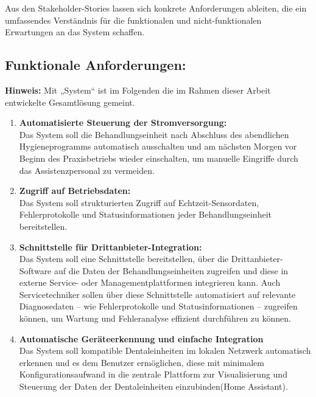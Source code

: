 Aus den Stakeholder-Stories lassen sich konkrete Anforderungen ableiten, die ein umfassendes Verständnis für die funktionalen und nicht-funktionalen Erwartungen an das System schaffen.

\subsection{Funktionale Anforderungen:}
\textbf{Hinweis:} Mit „System“ ist im Folgenden die im Rahmen dieser Arbeit entwickelte Gesamtlösung gemeint.

\begin{enumerate}
    \item \textbf{Automatisierte Steuerung der Stromversorgung:} \\
    Das System soll die Behandlungseinheit nach Abschluss des abendlichen Hygieneprogramms automatisch ausschalten und am nächsten Morgen vor Beginn des Praxisbetriebs wieder einschalten, um manuelle Eingriffe durch das Assistenzpersonal zu vermeiden.\\
    
    \item \textbf{Zugriff auf Betriebsdaten:} \\
    Das System soll strukturierten Zugriff auf Echtzeit-Sensordaten, Fehlerprotokolle und Statusinformationen jeder Behandlungseinheit bereitstellen.\\

    \item \textbf{Schnittstelle für Drittanbieter-Integration:} \\
    Das System soll eine Schnittstelle bereitstellen, über die Drittanbieter-Software auf die Daten der Behandlungseinheiten zugreifen und diese in externe Service- oder Managementplattformen integrieren kann. Auch Servicetechniker sollen über diese Schnittstelle automatisiert auf relevante Diagnosedaten – wie Fehlerprotokolle und Statusinformationen – zugreifen können, um Wartung und Fehleranalyse effizient durchführen zu können.\\

    \item \textbf{Automatische Geräteerkennung und einfache Integration} \\
    Das System soll kompatible Dentaleinheiten im lokalen Netzwerk automatisch erkennen und es dem Benutzer ermöglichen, diese mit minimalem Konfigurationsaufwand in die zentrale Plattform zur Visualisierung und Steuerung der Daten der Dentaleinheiten einzubinden(Home Assistant).\\


\end{enumerate}
